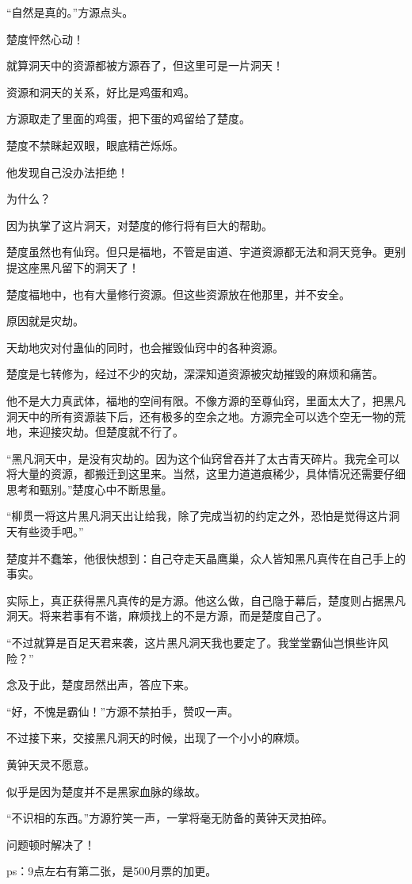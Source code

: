 \begin{this_body}
“自然是真的。”方源点头。

楚度怦然心动！

就算洞天中的资源都被方源吞了，但这里可是一片洞天！

资源和洞天的关系，好比是鸡蛋和鸡。

方源取走了里面的鸡蛋，把下蛋的鸡留给了楚度。

楚度不禁眯起双眼，眼底精芒烁烁。

他发现自己没办法拒绝！

为什么？

因为执掌了这片洞天，对楚度的修行将有巨大的帮助。

楚度虽然也有仙窍。但只是福地，不管是宙道、宇道资源都无法和洞天竞争。更别提这座黑凡留下的洞天了！

楚度福地中，也有大量修行资源。但这些资源放在他那里，并不安全。

原因就是灾劫。

天劫地灾对付蛊仙的同时，也会摧毁仙窍中的各种资源。

楚度是七转修为，经过不少的灾劫，深深知道资源被灾劫摧毁的麻烦和痛苦。

他不是大力真武体，福地的空间有限。不像方源的至尊仙窍，里面太大了，把黑凡洞天中的所有资源装下后，还有极多的空余之地。方源完全可以选个空无一物的荒地，来迎接灾劫。但楚度就不行了。

“黑凡洞天中，是没有灾劫的。因为这个仙窍曾吞并了太古青天碎片。我完全可以将大量的资源，都搬迁到这里来。当然，这里力道道痕稀少，具体情况还需要仔细思考和甄别。”楚度心中不断思量。

“柳贯一将这片黑凡洞天出让给我，除了完成当初的约定之外，恐怕是觉得这片洞天有些烫手吧。”

楚度并不蠢笨，他很快想到：自己夺走天晶鹰巢，众人皆知黑凡真传在自己手上的事实。

实际上，真正获得黑凡真传的是方源。他这么做，自己隐于幕后，楚度则占据黑凡洞天。将来若事有不谐，麻烦找上的不是方源，而是楚度自己了。

“不过就算是百足天君来袭，这片黑凡洞天我也要定了。我堂堂霸仙岂惧些许风险？”

念及于此，楚度昂然出声，答应下来。

“好，不愧是霸仙！”方源不禁拍手，赞叹一声。

不过接下来，交接黑凡洞天的时候，出现了一个小小的麻烦。

黄钟天灵不愿意。

似乎是因为楚度并不是黑家血脉的缘故。

“不识相的东西。”方源狞笑一声，一掌将毫无防备的黄钟天灵拍碎。

问题顿时解决了！

ps：9点左右有第二张，是500月票的加更。

\end{this_body}


